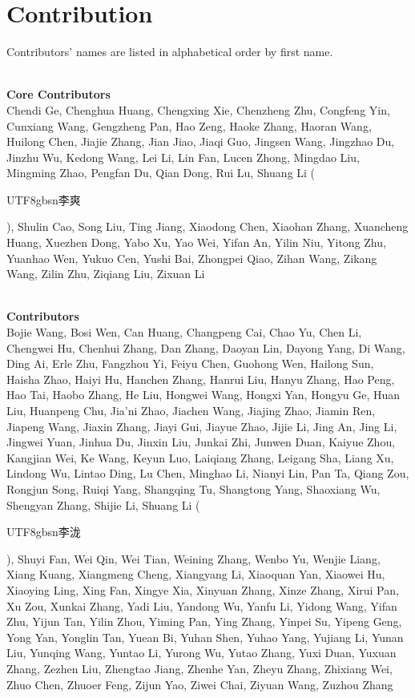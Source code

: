\newpage
\section{Contribution}
\label{sec:contribution}
\newcommand{\cpara}[1]{~\\\textbf{#1}~\\}
Contributors' names are listed in alphabetical order by first name. 

\cpara{Core Contributors}

Chendi Ge, Chenghua Huang, Chengxing Xie, Chenzheng Zhu, Congfeng Yin, Cunxiang Wang, Gengzheng Pan, Hao Zeng, Haoke Zhang, Haoran Wang, Huilong Chen, Jiajie Zhang, Jian Jiao, Jiaqi Guo, Jingsen Wang, Jingzhao Du, Jinzhu Wu, Kedong Wang, Lei Li, Lin Fan, Lucen Zhong, Mingdao Liu, Mingming Zhao, Pengfan Du, Qian Dong, Rui Lu, Shuang Li (\begin{CJK*}{UTF8}{gbsn}李爽\end{CJK*}), Shulin Cao, Song Liu, Ting Jiang, Xiaodong Chen, Xiaohan Zhang, Xuancheng Huang, Xuezhen Dong, Yabo Xu, Yao Wei, Yifan An, Yilin Niu, Yitong Zhu, Yuanhao Wen, Yukuo Cen, Yushi Bai, Zhongpei Qiao, Zihan Wang, Zikang Wang, Zilin Zhu, Ziqiang Liu, Zixuan Li

\cpara{Contributors}

Bojie Wang, Bosi Wen, Can Huang, Changpeng Cai, Chao Yu, Chen Li, Chengwei Hu, Chenhui Zhang, Dan Zhang, Daoyan Lin, Dayong Yang, Di Wang, Ding Ai, Erle Zhu, Fangzhou Yi, Feiyu Chen, Guohong Wen, Hailong Sun, Haisha Zhao, Haiyi Hu, Hanchen Zhang, Hanrui Liu, Hanyu Zhang, Hao Peng, Hao Tai, Haobo Zhang, He Liu, Hongwei Wang, Hongxi Yan, Hongyu Ge, Huan Liu, Huanpeng Chu, Jia'ni Zhao, Jiachen Wang, Jiajing Zhao, Jiamin Ren, Jiapeng Wang, Jiaxin Zhang, Jiayi Gui, Jiayue Zhao, Jijie Li, Jing An, Jing Li, Jingwei Yuan, Jinhua Du, Jinxin Liu, Junkai Zhi, Junwen Duan, Kaiyue Zhou, Kangjian Wei, Ke Wang, Keyun Luo, Laiqiang Zhang, Leigang Sha, Liang Xu, Lindong Wu, Lintao Ding, Lu Chen, Minghao Li, Nianyi Lin, Pan Ta, Qiang Zou, Rongjun Song, Ruiqi Yang, Shangqing Tu, Shangtong Yang, Shaoxiang Wu, Shengyan Zhang, Shijie Li, Shuang Li (\begin{CJK*}{UTF8}{gbsn}李泷\end{CJK*}), Shuyi Fan, Wei Qin, Wei Tian, Weining Zhang, Wenbo Yu, Wenjie Liang, Xiang Kuang, Xiangmeng Cheng, Xiangyang Li, Xiaoquan Yan, Xiaowei Hu, Xiaoying Ling, Xing Fan, Xingye Xia, Xinyuan Zhang, Xinze Zhang, Xirui Pan, Xu Zou, Xunkai Zhang, Yadi Liu, Yandong Wu, Yanfu Li, Yidong Wang, Yifan Zhu, Yijun Tan, Yilin Zhou, Yiming Pan, Ying Zhang, Yinpei Su, Yipeng Geng, Yong Yan, Yonglin Tan, Yuean Bi, Yuhan Shen, Yuhao Yang, Yujiang Li, Yunan Liu, Yunqing Wang, Yuntao Li, Yurong Wu, Yutao Zhang, Yuxi Duan, Yuxuan Zhang, Zezhen Liu, Zhengtao Jiang, Zhenhe Yan, Zheyu Zhang, Zhixiang Wei, Zhuo Chen, Zhuoer Feng, Zijun Yao, Ziwei Chai, Ziyuan Wang, Zuzhou Zhang


